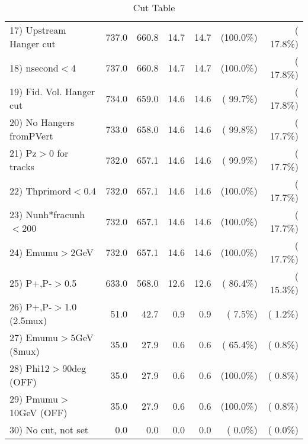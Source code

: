 \begin{table}[h!]
\begin{tabular}{||l||r|r|r|r|r|r||}
 17) Upstream Hanger cut  &        737.0 &        660.8 &         14.7 &         14.7 & (100.0\%) & ( 17.8\%) \\
 18) nsecond$<$4          &        737.0 &        660.8 &         14.7 &         14.7 & (100.0\%) & ( 17.8\%) \\
 19) Fid. Vol. Hanger cut &        734.0 &        659.0 &         14.6 &         14.6 & ( 99.7\%) & ( 17.8\%) \\
 20) No Hangers fromPVert &        733.0 &        658.0 &         14.6 &         14.6 & ( 99.8\%) & ( 17.7\%) \\
 21) Pz$>$0 for tracks    &        732.0 &        657.1 &         14.6 &         14.6 & ( 99.9\%) & ( 17.7\%) \\
 22) Thprimord$<$0.4      &        732.0 &        657.1 &         14.6 &         14.6 & (100.0\%) & ( 17.7\%) \\
 23) Nunh*fracunh$<$200   &        732.0 &        657.1 &         14.6 &         14.6 & (100.0\%) & ( 17.7\%) \\
 24) Emumu$>$2GeV         &        732.0 &        657.1 &         14.6 &         14.6 & (100.0\%) & ( 17.7\%) \\
 25) P+,P-$>$0.5          &        633.0 &        568.0 &         12.6 &         12.6 & ( 86.4\%) & ( 15.3\%) \\
 26) P+,P-$>$1.0 (2.5mux) &         51.0 &         42.7 &          0.9 &          0.9 & (  7.5\%) & (  1.2\%) \\
 27) Emumu$>$5GeV  (8mux) &         35.0 &         27.9 &          0.6 &          0.6 & ( 65.4\%) & (  0.8\%) \\
 28) Phi12$>$90deg  (OFF) &         35.0 &         27.9 &          0.6 &          0.6 & (100.0\%) & (  0.8\%) \\
 29) Pmumu$>$10GeV  (OFF) &         35.0 &         27.9 &          0.6 &          0.6 & (100.0\%) & (  0.8\%) \\
 30) No cut, not set      &          0.0 &          0.0 &          0.0 &          0.0 & (  0.0\%) & (  0.0\%) \\
 \hline
 \hline
 \end{tabular}
 \caption{Cut Table           }
 \label{tab-cutheavy_neutrino_2.000}
 \end{table}
